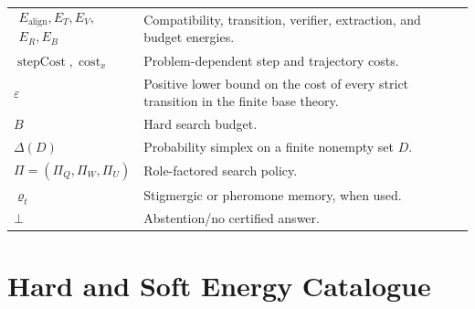 \documentclass[11pt,oneside]{book}
\theoremstyle{remark}
\newcommand{\eps}{\varepsilon}
\DeclareMathOperator{\cost}{cost}
\begin{document}
{\begin{longtable}{>{\RaggedRight\arraybackslash}p{}
>{\RaggedRight\arraybackslash}p{}}
$\begin{gathered}E_{\mathrm{align}},E_T,E_V,\\E_R,E_B\end{gathered}$ & Compatibility, transition, verifier, extraction, and budget energies. \\
$\operatorname{stepCost},\cost_x$ & Problem-dependent step and trajectory costs. \\
$\eps$ & Positive lower bound on the cost of every strict transition in the finite base theory. \\
$B$ & Hard search budget. \\
$\Delta(D)$ & Probability simplex on a finite nonempty set $D$. \\
$\Pi=(\Pi_Q,\Pi_W,\Pi_U)$ & Role-factored search policy. \\
$\varrho_t$ & Stigmergic or pheromone memory, when used. \\
$\bot$ & Abstention/no certified answer. \\
\bottomrule
\end{longtable}
}

\chapter{Hard and Soft Energy Catalogue}
\end{document}
